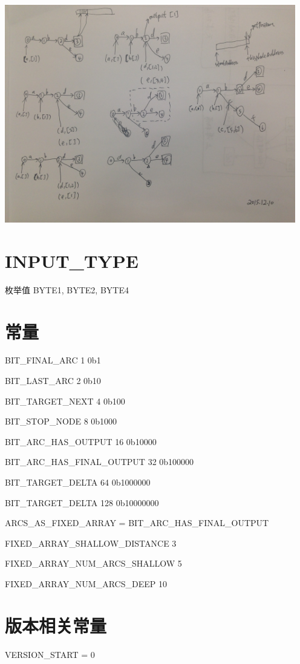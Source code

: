 \documentclass{article}
\begin{document}
\begin{center}
    \includegraphics[width=360pt]{IMG_2810.JPG}
\end{center}


\section{INPUT\_TYPE}

枚举值 {BYTE1, BYTE2, BYTE4}

\section{常量}
BIT\_FINAL\_ARC 1 0b1

BIT\_LAST\_ARC 2 0b10

BIT\_TARGET\_NEXT 4 0b100

BIT\_STOP\_NODE 8 0b1000

BIT\_ARC\_HAS\_OUTPUT 16 0b10000

BIT\_ARC\_HAS\_FINAL\_OUTPUT 32 0b100000

BIT\_TARGET\_DELTA 64 0b1000000

BIT\_TARGET\_DELTA 128 0b10000000

ARCS\_AS\_FIXED\_ARRAY = BIT\_ARC\_HAS\_FINAL\_OUTPUT

FIXED\_ARRAY\_SHALLOW\_DISTANCE 3

FIXED\_ARRAY\_NUM\_ARCS\_SHALLOW 5

FIXED\_ARRAY\_NUM\_ARCS\_DEEP 10

\section{版本相关常量}
VERSION\_START = 0
\end{document}
